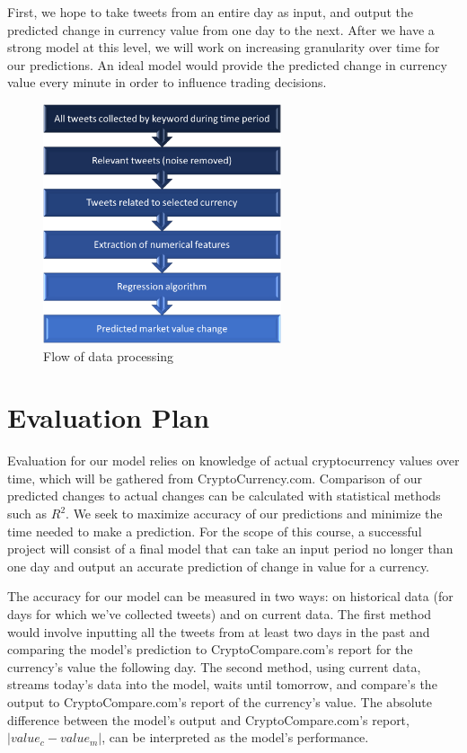 \documentclass[sigconf]{acmart}
\begin{document}
First, we hope to take tweets from an entire day as input, and output the predicted change in currency value from one day to the next. After we have a strong model at this level, we will work on increasing granularity over time for our predictions. An ideal model would provide the predicted change in currency value every minute in order to influence trading decisions.


\begin{figure}[H]
\caption{Flow of data processing}
\includegraphics[width=7cm]{chart.png}
\end{figure}


\section{Evaluation Plan}
Evaluation for our model relies on knowledge of actual cryptocurrency values over time, which will be gathered from CryptoCurrency.com. Comparison of our predicted changes to actual changes can be calculated with statistical methods such as $R^2$. We seek to maximize accuracy of our predictions and minimize the time needed to make a prediction. For the scope of this course, a successful project will consist of a final model that can take an input period no longer than one day and output an accurate prediction of change in value for a currency.

The accuracy for our model can be measured in two ways: on historical data (for days for which we've collected tweets) and on current data. The first method would involve inputting all the tweets from at least two days in the past and comparing the model's prediction to CryptoCompare.com's report for the currency's value the following day. The second method, using current data, streams today's data into the model, waits until tomorrow, and compare's the output to CryptoCompare.com's report of the currency's value. The absolute difference between the model's output and CryptoCompare.com's report, $|value_c - value_m|$, can be interpreted as the model's performance.
\end{document}
